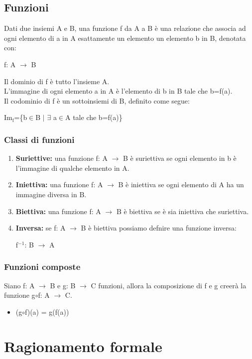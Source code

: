 \documentclass{book}
\begin{document}
    \section{Funzioni}
    Dati due insiemi A e B, una funzione f da A a B è una relazione che associa ad ogni elemento di a in A esattamente un elemento un elemento b in B, denotata con:
    \begin{center}
        f: A $\to$ B
    \end{center}
    Il dominio di f è tutto l'insieme A.\\
    L'immagine di ogni elemento a in A è l'elemento di b in B tale che b=f(a).\\
    Il codominio di f è un sottoinsiemi di B, definito come segue:
    \begin{center}
        $\text{Im}_\text{f}$=\{b$\in$B $|$ $\exists$ a$\in$A tale che b=f(a)\}
    \end{center}

    \subsection{Classi di funzioni}
    \begin{enumerate}
        \item \textbf{Suriettive:} una funzione f: A $\to$ B è suriettiva se ogni elemento in b è l'immagine di qualche elemento in A.
        \item \textbf{Iniettiva:} una funzione f: A $\to$ B è iniettiva se ogni elemento di A ha un immagine diversa in B.
        \item \textbf{Biettiva:} una funzione f: A $\to$ B è biettiva se è sia iniettiva che suriettiva.
        \item \textbf{Inversa:} se f: A $\to$ B è biettiva possiamo defnire una funzione inversa:
            \begin{center}
                f$^{-1}$: B $\to$ A
            \end{center}
    \end{enumerate}

    \subsection{Funzioni composte}
    Siano f: A $\to$ B e g: B $\to$ C funzioni, allora la composizione di f e g creerà la funzione g$\circ$f: A $\to$ C.
    \begin{itemize}
        \item (g$\circ$f)(a) = g(f(a))
    \end{itemize}

    \chapter{Ragionamento formale}
\end{document}
